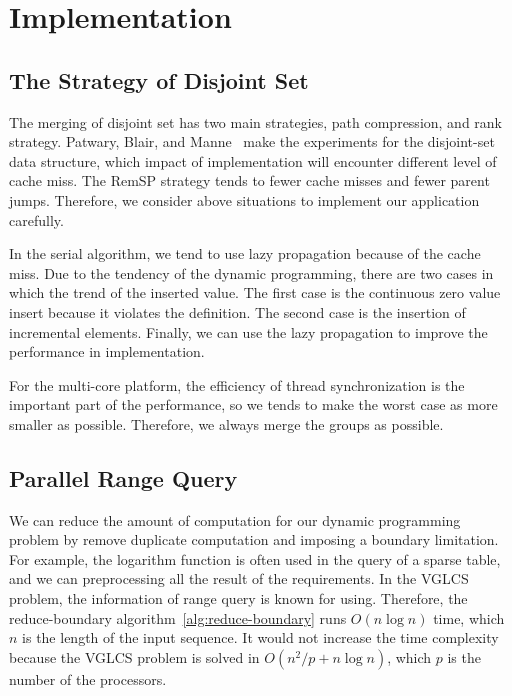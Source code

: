 \section{Implementation}
\label{sec:Implementation}

\subsection{The Strategy of Disjoint Set}

The merging of disjoint set has two main strategies, path compression,
and rank strategy.  Patwary, Blair, and
Manne~\cite{Patwary2010ExperimentsOU} make the experiments for the
disjoint-set data structure, which impact of implementation will
encounter different level of cache miss. The {\textrm RemSP} strategy
tends to fewer cache misses and fewer parent jumps.  Therefore, we
consider above situations to implement our application carefully.

\iffalse
運行 VGLCS 時，將耗費 $\theta(n^2)$ 的內存空間。使用遞增後綴最大值 (ISMQ) 時，
採用並查集實作將會遭遇到很多不平衡的工作負載，其原因在於合併的策略，
常見的有路徑壓縮和啟發式合併兩種策略，這間接影響到不同次數的分枝判斷。
實務上須考慮到快取未中
\fi

In the serial algorithm, we tend to use lazy propagation because of the
cache miss.  Due to the tendency of the dynamic programming, there are
two cases in which the trend of the inserted value.  The first case is
the continuous zero value insert because it violates the definition.
The second case is the insertion of incremental elements.  Finally, we
can use the lazy propagation to improve the performance in
implementation.

For the multi-core platform, the efficiency of thread synchronization is
the important part of the performance, so we tends to make the worst
case as more smaller as possible.  Therefore, we always merge the groups
as possible.

\iffalse
每個執行緒負責數個完整的并查集，操作時應偏向延遲標記操作，
儘早合併的策略易造成快取未中。由於動態規劃的傾向中，插入值的趨勢有兩種情況，
其一為連續不合定義的零元素插入，其二為遞增元素的插入，在這兩者穿插的趨勢中，
我們發現延遲操作將會帶來較能改善快取未中問題。
\fi

\subsection{Parallel Range Query}

We can reduce the amount of computation for our dynamic programming
problem by remove duplicate computation and imposing a boundary
limitation.  For example, the logarithm function is often used in the
query of a sparse table, and we can preprocessing all the result of the
requirements.  In the VGLCS problem, the information of range query is
known for using.  Therefore, the reduce-boundary 
algorithm~\ref{alg:reduce-boundary} runs $O(n \log n)$ time, which $n$ 
is the length of the input sequence.  It would not increase the time 
complexity because the VGLCS problem is solved in 
$O(n^2 / p + n \log n)$, which $p$ is the number of the processors.


